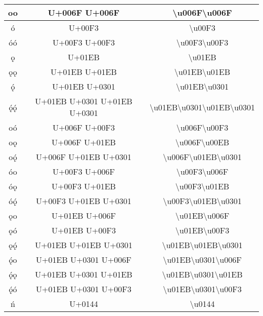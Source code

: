 \begin{longtable}{|c|c|c|}
oo &  U+006F  U+006F & \textbackslash{}u006F\textbackslash{}u006F \\ \hline
ó & U+00F3 & \textbackslash{}u00F3 \\ \hline
óó & U+00F3 U+00F3 & \textbackslash{}u00F3\textbackslash{}u00F3 \\ \hline
ǫ & U+01EB & \textbackslash{}u01EB \\ \hline
ǫǫ & U+01EB U+01EB & \textbackslash{}u01EB\textbackslash{}u01EB \\ \hline
ǫ́ & U+01EB U+0301 & \textbackslash{}u01EB\textbackslash{}u0301 \\ \hline
ǫ́ǫ́ & U+01EB U+0301 U+01EB U+0301 & \textbackslash{}u01EB\textbackslash{}u0301\textbackslash{}u01EB\textbackslash{}u0301 \\ \hline

oó &  U+006F U+00F3 & \textbackslash{}u006F\textbackslash{}u00F3 \\ \hline
oǫ &  U+006F U+01EB & \textbackslash{}u006F\textbackslash{}u00EB \\ \hline
oǫ́ &  U+006F U+01EB U+0301 & \textbackslash{}u006F\textbackslash{}u01EB\textbackslash{}u0301 \\ \hline

óo & U+00F3 U+006F & \textbackslash{}u00F3\textbackslash{}u006F \\ \hline
óǫ & U+00F3 U+01EB & \textbackslash{}u00F3\textbackslash{}u01EB \\ \hline
óǫ́ & U+00F3 U+01EB U+0301 & \textbackslash{}u00F3\textbackslash{}u01EB\textbackslash{}u0301 \\ \hline

ǫo & U+01EB U+006F  & \textbackslash{}u01EB\textbackslash{}u006F \\ \hline
ǫó & U+01EB U+00F3 & \textbackslash{}u01EB\textbackslash{}u00F3 \\ \hline
ǫǫ́ & U+01EB U+01EB U+0301 & \textbackslash{}u01EB\textbackslash{}u01EB\textbackslash{}u0301 \\ \hline

ǫ́o & U+01EB U+0301 U+006F & \textbackslash{}u01EB\textbackslash{}u0301\textbackslash{}u006F \\ \hline
ǫ́ǫ & U+01EB U+0301 U+01EB & \textbackslash{}u01EB\textbackslash{}u0301\textbackslash{}u01EB \\ \hline
ǫ́ó & U+01EB U+0301 U+00F3 & \textbackslash{}u01EB\textbackslash{}u0301\textbackslash{}u00F3 \\ \hline

ń & U+0144 & \textbackslash{}u0144 \\ \hline
\end{longtable}
